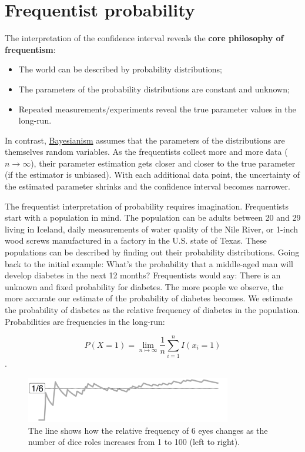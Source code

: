 \documentclass[
  10pt,
]{scrbook}
\providecommand{\tightlist}{%
  \setlength{\itemsep}{0pt}\setlength{\parskip}{0pt}}
\begin{document}
\hypertarget{frequentist-probability}{%
\section{Frequentist probability}\label{frequentist-probability}}

The interpretation of the confidence interval reveals the \textbf{core philosophy of frequentism}:

\begin{itemize}
\tightlist
\item
  The world can be described by probability distributions;
\item
  The parameters of the probability distributions are constant and unknown;
\item
  Repeated measurements/experiments reveal the true parameter values in the long-run.
\end{itemize}

In contrast, \protect\hyperlink{bayesian-inference}{Bayesianism} assumes that the parameters of the distributions are themselves random variables.
As the frequentists collect more and more data (\(n \to \infty\)), their parameter estimation gets closer and closer to the true parameter (if the estimator is unbiased).
With each additional data point, the uncertainty of the estimated parameter shrinks and the confidence interval becomes narrower.

The frequentist interpretation of probability requires imagination.
Frequentists start with a population in mind.
The population can be adults between 20 and 29 living in Iceland, daily measurements of water quality of the Nile River, or 1-inch wood screws manufactured in a factory in the U.S. state of Texas.
These populations can be described by finding out their probability distributions.
Going back to the initial example:
What's the probability that a middle-aged man will develop diabetes in the next 12 months?
Frequentists would say: There is an unknown and fixed probability for diabetes.
The more people we observe, the more accurate our estimate of the probability of diabetes becomes.
We estimate the probability of diabetes as the relative frequency of diabetes in the population.
Probabilities are frequencies in the long-run:

\[P(X=1) = \lim_{n \mapsto \infty} \frac{1}{n}\sum_{i=1}^{n} I(x_i = 1)\].

\begin{figure}

{\centering \includegraphics[width=0.8\textwidth]{figures/dice-1} 

}

\caption{The line shows how the relative frequency of 6 eyes changes as the number of dice roles increases from 1 to 100 (left to right).}\label{fig:dice}
\end{figure}
\end{document}
